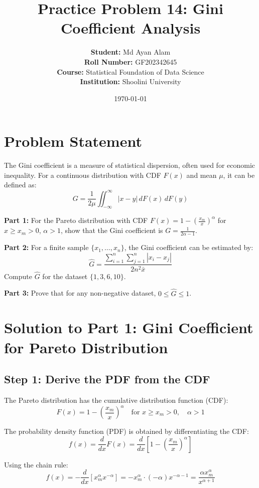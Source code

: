 \documentclass[12pt,a4paper]{article}
\title{\textbf{\Large Practice Problem 14: Gini Coefficient Analysis}}
\author{
    \textbf{Student:} Md Ayan Alam \\
    \textbf{Roll Number:} GF202342645 \\
    \textbf{Course:} Statistical Foundation of Data Science \\
    \textbf{Institution:} Shoolini University
}
\date{\today}
\theoremstyle{definition}
\begin{document}
\maketitle
\thispagestyle{fancy}

\section*{Problem Statement}

\begin{tcolorbox}[colback=blue!5!white,colframe=headercolor,title=Problem 14: Gini Coefficient]
The Gini coefficient is a measure of statistical dispersion, often used for economic inequality. For a continuous distribution with CDF $F(x)$ and mean $\mu$, it can be defined as:
\[
G = \frac{1}{2\mu} \iint_{-\infty}^{\infty} |x - y| \, dF(x) \, dF(y)
\]

\textbf{Part 1:} For the Pareto distribution with CDF $F(x) = 1 - \left(\frac{x_m}{x}\right)^\alpha$ for $x \geq x_m > 0$, $\alpha > 1$, show that the Gini coefficient is $G = \frac{1}{2\alpha - 1}$.

\textbf{Part 2:} For a finite sample $\{x_1, \ldots, x_n\}$, the Gini coefficient can be estimated by:
\[
\hat{G} = \frac{\sum_{i=1}^n \sum_{j=1}^n |x_i - x_j|}{2n^2 \bar{x}}
\]
Compute $\hat{G}$ for the dataset $\{1, 3, 6, 10\}$.

\textbf{Part 3:} Prove that for any non-negative dataset, $0 \leq \hat{G} \leq 1$.
\end{tcolorbox}

\section{Solution to Part 1: Gini Coefficient for Pareto Distribution}

\subsection{Step 1: Derive the PDF from the CDF}

The Pareto distribution has the cumulative distribution function (CDF):
\[
F(x) = 1 - \left( \frac{x_m}{x} \right)^\alpha \quad \text{for } x \geq x_m > 0, \quad \alpha > 1
\]

The probability density function (PDF) is obtained by differentiating the CDF:
\[
f(x) = \frac{d}{dx}F(x) = \frac{d}{dx}\left[1 - \left( \frac{x_m}{x} \right)^\alpha\right]
\]

Using the chain rule:
\[
f(x) = -\frac{d}{dx}\left[x_m^\alpha x^{-\alpha}\right] = -x_m^\alpha \cdot (-\alpha) x^{-\alpha-1} = \frac{\alpha x_m^\alpha}{x^{\alpha+1}}
\]
\end{document}
